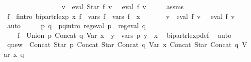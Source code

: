 \begin{isabellebody}
\ \ \ \ \ \ \ \ \ \ \ \ \ \ \ \ {\isasymand}\ {\isacharparenleft}{\kern0pt}{\isasymforall}v{\isachardot}{\kern0pt}\ {\isasymPsi}\ {\isacharparenleft}{\kern0pt}eval\ {\isacharparenleft}{\kern0pt}Star\ f{\isacharparenright}{\kern0pt}\ v{\isacharparenright}{\kern0pt}\ {\isacharequal}{\kern0pt}\ {\isasymPsi}\ {\isacharparenleft}{\kern0pt}eval\ f{\isacharprime}{\kern0pt}\ v{\isacharparenright}{\kern0pt}{\isacharparenright}{\kern0pt}{\isachardoublequoteclose}\isanewline
%
\isadelimproof
%
\endisadelimproof
%
\isatagproof
{}\isamarkupfalse%
\ {\isacharminus}{\kern0pt}\isanewline
\ \ \isamarkupfalse%
\ assms\ \isamarkupfalse%
\ f{\isacharprime}{\kern0pt}\ \ f{\isacharprime}{\kern0pt}{\isacharunderscore}{\kern0pt}intro{\isacharcolon}{\kern0pt}\ {\isachardoublequoteopen}bipart{\isacharunderscore}{\kern0pt}rlexp\ x\ f{\isacharprime}{\kern0pt}\ {\isasymand}\ vars\ f{\isacharprime}{\kern0pt}\ {\isacharequal}{\kern0pt}\ vars\ f\ {\isasymunion}\ {\isacharbraceleft}{\kern0pt}x{\isacharbraceright}{\kern0pt}\ {\isasymand}\isanewline
\ \ \ \ \ \ {\isacharparenleft}{\kern0pt}{\isasymforall}v{\isachardot}{\kern0pt}\ {\isasymPsi}\ {\isacharparenleft}{\kern0pt}eval\ f\ v{\isacharparenright}{\kern0pt}\ {\isacharequal}{\kern0pt}\ {\isasymPsi}\ {\isacharparenleft}{\kern0pt}eval\ f{\isacharprime}{\kern0pt}\ v{\isacharparenright}{\kern0pt}{\isacharparenright}{\kern0pt}{\isachardoublequoteclose}\ \isamarkupfalse%
\ auto\isanewline
\ \ \isamarkupfalse%
\ \isamarkupfalse%
\ p\ q\ \ p{\isacharunderscore}{\kern0pt}q{\isacharunderscore}{\kern0pt}intro{\isacharcolon}{\kern0pt}\ {\isachardoublequoteopen}reg{\isacharunderscore}{\kern0pt}eval\ p\ {\isasymand}\ reg{\isacharunderscore}{\kern0pt}eval\ q\ {\isasymand}\isanewline
\ \ \ \ f{\isacharprime}{\kern0pt}\ {\isacharequal}{\kern0pt}\ Union\ p\ {\isacharparenleft}{\kern0pt}Concat\ q\ {\isacharparenleft}{\kern0pt}Var\ x{\isacharparenright}{\kern0pt}{\isacharparenright}{\kern0pt}\ {\isasymand}\ {\isacharparenleft}{\kern0pt}{\isasymforall}y\ {\isasymin}\ vars\ p{\isachardot}{\kern0pt}\ y\ {\isasymnoteq}\ x{\isacharparenright}{\kern0pt}{\isachardoublequoteclose}\ \isamarkupfalse%
\ bipart{\isacharunderscore}{\kern0pt}rlexp{\isacharunderscore}{\kern0pt}def\ \isamarkupfalse%
\ auto\isanewline
\ \ \isamarkupfalse%
\ {\isacharquery}{\kern0pt}q{\isacharunderscore}{\kern0pt}new\ {\isacharequal}{\kern0pt}\ {\isachardoublequoteopen}Concat\ {\isacharparenleft}{\kern0pt}Star\ p{\isacharparenright}{\kern0pt}\ {\isacharparenleft}{\kern0pt}Concat\ {\isacharparenleft}{\kern0pt}Star\ {\isacharparenleft}{\kern0pt}Concat\ q\ {\isacharparenleft}{\kern0pt}Var\ x{\isacharparenright}{\kern0pt}{\isacharparenright}{\kern0pt}{\isacharparenright}{\kern0pt}\ {\isacharparenleft}{\kern0pt}Concat\ {\isacharparenleft}{\kern0pt}Star\ {\isacharparenleft}{\kern0pt}Concat\ q\ {\isacharparenleft}{\kern0pt}Var\ x{\isacharparenright}{\kern0pt}{\isacharparenright}{\kern0pt}{\isacharparenright}{\kern0pt}\ q{\isacharparenright}{\kern0pt}{\isacharparenright}{\kern0pt}{\isachardoublequoteclose}\isanewline

\end{isabellebody}
